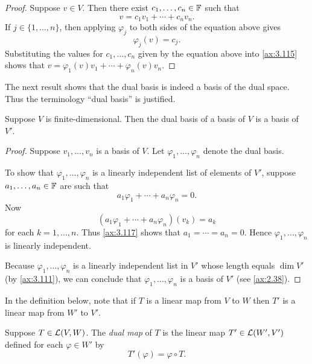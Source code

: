 \begin{proof}
Suppose $v\in V$. Then there exist $c_1,\dots,c_n\in\mathbb{F}$ such
that
\begin{equation*}
v = c_1v_1+\cdots+c_nv_n. \tag*{\thetheorem}\label{ax:3.115}
\end{equation*}
If $j\in\{1,\dots,n\}$, then applying $\varphi_j$ to both sides of the equation
above gives
\[ \varphi_j(v) = c_j. \]
Substituting the values for $c_1,\dots,c_n$ given by the equation above into
\ref{ax:3.115} shows that $v=\varphi_1(v)v_1+\cdots+\varphi_n(v)v_n$.
\end{proof}

The next result shows that the dual basis is indeed a basis of the dual space.
Thus the terminology ``dual basis'' is justified.

\begin{result}\label{ax:3.116}
Suppose $V$ is finite-dimensional. Then the dual basis of a basis of $V$ is a
basis of $V'$.
\end{result}

\begin{proof}
Suppose $v_1,\dots,v_n$ is a basis of $V$. Let $\varphi_1,\dots,\varphi_n$ denote
the dual basis.

To show that $\varphi_1,\dots,\varphi_n$ is a linearly independent list of
elements of $V'$, suppose $a_1,\dots,a_n\in\mathbb{F}$ are such
that
\begin{equation*}
a_1\varphi_1+\cdots+a_n\varphi_n = 0. \tag*{\thetheorem}\label{ax:3.117}
\end{equation*}
Now
\[ (a_1\varphi_1+\cdots+a_n\varphi_n)(v_k) = a_k \]
for each $k=1,\dots,n$. Thus \ref{ax:3.117} shows that $a_1=\cdots=a_n=0$. Hence
$\varphi_1,\dots,\varphi_n$ is linearly independent.

Because $\varphi_1,\dots,\varphi_n$ is a linearly independent list in $V'$ whose
length equals $\dim V'$ (by \ref{ax:3.111}), we can conclude that
$\varphi_1,\dots,\varphi_n$ is a basis of $V'$ (see \ref{ax:2.38}).
\end{proof}

In the definition below, note that if $T$ is a linear map from $V$ to $W$ then
$T'$ is a linear map from $W'$ to $V'$.

\begin{definition}\label{ax:3.118}
Suppose $T\in\mathcal{L}(V,W)$. The \emph{dual map} of $T$ is the linear map
$T'\in\mathcal{L}(W',V')$ defined for each $\varphi\in W'$ by
\[ T'(\varphi) = \varphi\circ T. \]
\end{definition}

